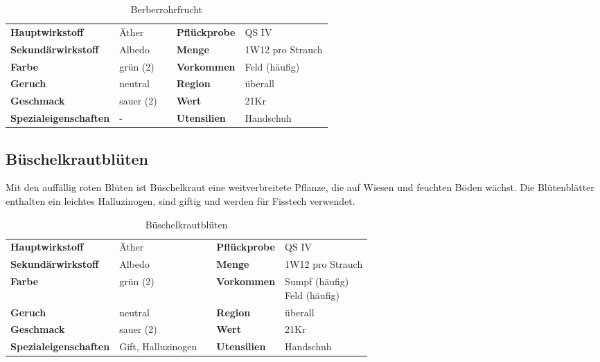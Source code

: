 \begin{table}[h]
\begin{center}
\begin{tabular}{|l|l|p{1cm}|l|l|}
	\cline{1-2} \cline{4-5}
	\textbf{Hauptwirkstoff} & Äther && \textbf{Pflückprobe} & QS IV \\ \cline{1-2} \cline{4-5}
	\textbf{Sekundärwirkstoff} & Albedo && \textbf{Menge} & 1W12 pro Strauch \\ \cline{1-2} \cline{4-5}
	\textbf{Farbe} & grün (2) && \textbf{Vorkommen} & Feld (häufig) \\ \cline{1-2} \cline{4-5}
	\textbf{Geruch} & neutral && \textbf{Region} & überall \\ \cline{1-2} \cline{4-5}
	\textbf{Geschmack} & sauer (2) && \textbf{Wert} & 21Kr \\ \cline{1-2} \cline{4-5}
	\textbf{Spezialeigenschaften} & - && \textbf{Utensilien} & Handschuh \\ \cline{1-2} \cline{4-5}
\end{tabular}
\end{center}
\caption{Berberrohrfrucht}
\label{tab:berberrohrfrucht}
\end{table}


\subsection{Büschelkrautblüten}
Mit den auffällig roten Blüten ist Büschelkraut eine weitverbreitete Pflanze, die auf Wiesen und feuchten Böden wächst. Die Blütenblätter enthalten ein leichtes Halluzinogen, sind giftig und werden für Fisstech verwendet. 

\begin{table}[h]
\begin{center}
\begin{tabular}{|l|l|p{1cm}|l|l|}
	\cline{1-2} \cline{4-5}
	\textbf{Hauptwirkstoff} & Äther && \textbf{Pflückprobe} & QS IV \\ \cline{1-2} \cline{4-5}
	\textbf{Sekundärwirkstoff} & Albedo && \textbf{Menge} & 1W12 pro Strauch \\ \cline{1-2} \cline{4-5}
	\textbf{Farbe} & grün (2) && \textbf{Vorkommen} & \brcell{Sumpf (häufig) \\ Feld (häufig)} \\ \cline{1-2} \cline{4-5}
	\textbf{Geruch} & neutral && \textbf{Region} & überall \\ \cline{1-2} \cline{4-5}
	\textbf{Geschmack} & sauer (2) && \textbf{Wert} & 21Kr \\ \cline{1-2} \cline{4-5}
	\textbf{Spezialeigenschaften} & Gift, Halluzinogen && \textbf{Utensilien} & Handschuh \\ \cline{1-2} \cline{4-5}
\end{tabular}
\end{center}
\caption{Büschelkrautblüten}
\label{tab:bueschelkrautblueten}
\end{table}


